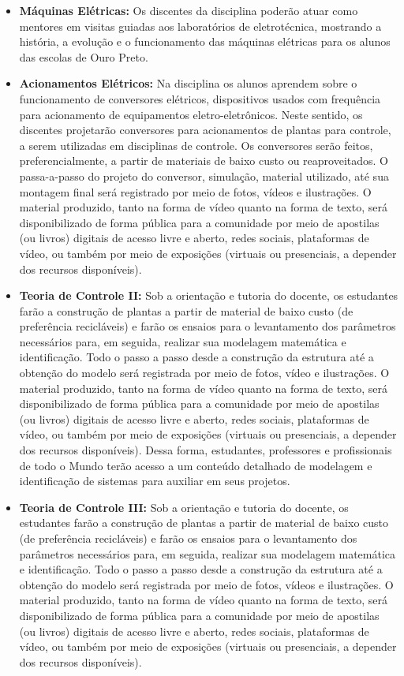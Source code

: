 \documentclass[
	12pt,				%
	openright,			%
	oneside,			%
	a4paper,			%
	english,			%
	brazil				%
	]{abntex2}
\begin{document}
\begin{itemize}
    \item \textbf{Máquinas Elétricas:} Os discentes da disciplina poderão atuar como mentores em visitas guiadas aos laboratórios de eletrotécnica, mostrando a história, a evolução e o funcionamento das máquinas elétricas para os alunos das escolas de Ouro Preto.

    \item \textbf{Acionamentos Elétricos:} Na disciplina os alunos aprendem sobre o funcionamento de conversores elétricos, dispositivos usados com frequência para acionamento de equipamentos eletro-eletrônicos. Neste sentido, os discentes projetarão conversores para acionamentos de plantas para controle, a serem utilizadas em disciplinas de controle. Os conversores serão feitos, preferencialmente, a partir de materiais de baixo custo ou reaproveitados. O passa-a-passo do  projeto do conversor, simulação, material utilizado, até sua montagem final será registrado por meio de fotos, vídeos e ilustrações. O material produzido, tanto na forma de vídeo quanto na forma de texto, será disponibilizado de forma pública para a comunidade por meio de apostilas (ou livros) digitais de acesso livre e aberto, redes sociais, plataformas de vídeo, ou também por meio de exposições (virtuais ou presenciais, a depender dos recursos disponíveis).

    \item \textbf{Teoria de Controle II:} Sob a orientação e tutoria do docente, os estudantes farão a construção de plantas a partir de material de baixo custo (de preferência recicláveis) e farão os ensaios para o levantamento dos parâmetros necessários para, em seguida, realizar sua modelagem matemática e identificação. Todo o passo a passo desde a construção da estrutura até a obtenção do modelo será registrada por meio de fotos, vídeo e ilustrações. O material produzido, tanto na forma de vídeo quanto na forma de texto, será disponibilizado de forma pública para a comunidade por meio de apostilas (ou livros) digitais de acesso livre e aberto, redes sociais, plataformas de vídeo, ou também por meio de exposições (virtuais ou presenciais, a depender dos recursos disponíveis). Dessa forma, estudantes, professores e profissionais de todo o Mundo terão acesso a um conteúdo detalhado de modelagem e identificação de sistemas para auxiliar em seus projetos.

    \item \textbf{Teoria de Controle III:}  Sob a orientação e tutoria do docente, os estudantes farão a construção de plantas a partir de material de baixo custo (de preferência recicláveis) e farão os ensaios para o levantamento dos parâmetros necessários para, em seguida, realizar sua modelagem matemática e identificação. Todo o passo a passo desde a construção da estrutura até a obtenção do modelo será registrada por meio de fotos, vídeos e ilustrações. O material produzido, tanto na forma de vídeo quanto na forma de texto, será disponibilizado de forma pública para a comunidade por meio de apostilas (ou livros) digitais de acesso livre e aberto, redes sociais, plataformas de vídeo, ou também por meio de exposições (virtuais ou presenciais, a depender dos recursos disponíveis).


\end{itemize}
\end{document}
